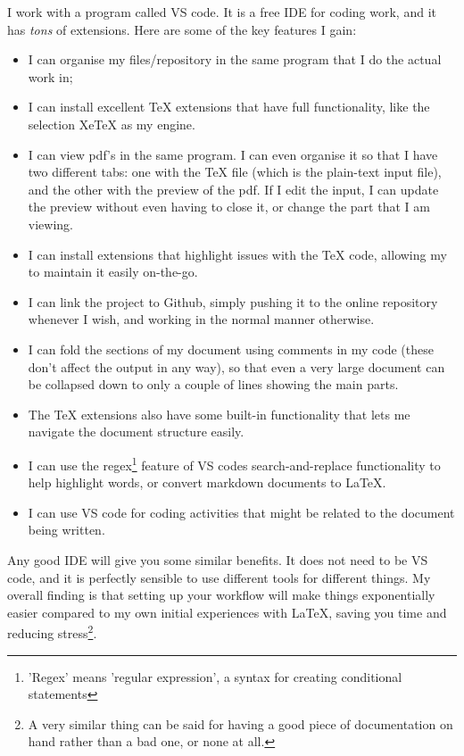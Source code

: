 \documentclass[11pt, oneside]{memoir}
\begin{document}
I work with a program called VS code. It is a free IDE for coding work, and it has \emph{tons} of extensions. Here are some of the key features I gain:
\begin{itemize}
    \item I can organise my files/repository in the same program that I do the actual work in;
    \item I can install excellent TeX extensions that have full functionality, like the selection XeTeX as my engine.
    \item I can view pdf's in the same program. I can even organise it so that I have two different tabs: one with the TeX file (which is the plain-text input file), and the other with the preview of the pdf. If I edit the input, I can update the preview without even having to close it, or change the part that I am viewing.
    \item I can install extensions that highlight issues with the TeX code, allowing my to maintain it easily on-the-go.
    \item I can link the project to Github, simply pushing it to the online repository whenever I wish, and working in the normal manner otherwise.
    \item I can fold the sections of my document using comments in my code (these don't affect the output in any way), so that even a very large document can be collapsed down to only a couple of lines showing the main parts.
    \item The TeX extensions also have some built-in functionality that lets me navigate the document structure easily.
    \item I can use the regex\footnote{'Regex' means 'regular expression', a syntax for creating conditional statements} feature of VS codes search-and-replace functionality to help highlight words, or convert markdown documents to LaTeX.
    \item I can use VS code for coding activities that might be related to the document being written.
\end{itemize}

Any good IDE will give you some similar benefits. It does not need to be VS code, and it is perfectly sensible to use different tools for different things. My overall finding is that setting up your workflow will make things exponentially easier compared to my own initial experiences with LaTeX, saving you time and reducing stress\footnote{ A very similar thing can be said for having a good piece of documentation on hand rather than a bad one, or none at all.}.
\end{document}
